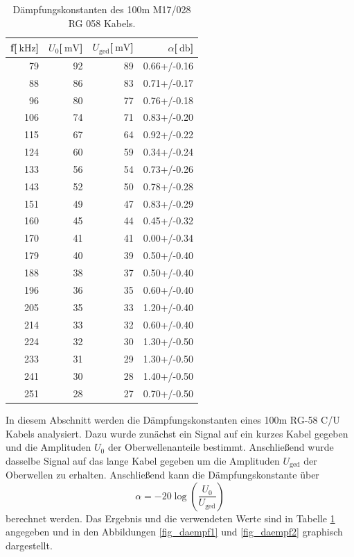 \begin{table}
\centering
	\caption[]{Dämpfungskonstanten des 100m M17/028 RG 058 Kabels.}
	\begin{tabular}{r r r r}
		f[$\SI{}{\kilo\hertz}$] & $U_0$[$\SI{}{\milli\volt}$] & $U_\text{ged}$[$\SI{}{\milli\volt}$] & $\alpha$[$\SI{}{\decibel}$]\\
		\hline \hline
			79	&	92	&	89	&	0.66+/-0.16 \\
			88	&	86	&	83	&	0.71+/-0.17 \\
			96	&	80	&	77	&	0.76+/-0.18 \\
			106	&	74	&	71	&	0.83+/-0.20 \\
			115	&	67	&	64	&	0.92+/-0.22 \\
			124	&	60	&	59	&	0.34+/-0.24 \\
			133	&	56	&	54	&	0.73+/-0.26 \\
			143	&	52	&	50	&	0.78+/-0.28 \\
			151	&	49	&	47	&	0.83+/-0.29 \\
			160	&	45	&	44	&	0.45+/-0.32 \\
			170	&	41	&	41	&	0.00+/-0.34 \\
			179	&	40	&	39	&	0.50+/-0.40 \\
			188	&	38	&	37	&	0.50+/-0.40 \\
			196	&	36	&	35	&	0.60+/-0.40 \\
			205	&	35	&	33	&	1.20+/-0.40 \\
			214	&	33	&	32	&	0.60+/-0.40 \\
			224	&	32	&	30	&	1.30+/-0.50 \\
			233	&	31	&	29	&	1.30+/-0.50 \\
			241	&	30	&	28	&	1.40+/-0.50 \\
			251	&	28	&	27	&	0.70+/-0.50\\
			\hline
	\end{tabular}
	\label{tab_daempf}
\end{table}

In diesem Abschnitt werden die Dämpfungskonstanten eines 100m RG-58 C/U Kabels analysiert.
Dazu wurde zunächst ein Signal auf ein kurzes Kabel gegeben und die Amplituden $U_0$ der Oberwellenanteile bestimmt.
Anschließend wurde dasselbe Signal auf das lange Kabel gegeben um die Amplituden $U_\text{ged}$ der Oberwellen zu erhalten.
Anschließend kann die Dämpfungskonstante über
\begin{equation*}
	\alpha = -20 \log \left( \frac{U_0}{U_\text{ged}}\right)
\end{equation*}
berechnet werden.
Das Ergebnis und die verwendeten Werte sind in Tabelle \ref{tab_daempf} angegeben und in den Abbildungen \ref{fig_daempf1} und \ref{fig_daempf2} graphisch dargestellt.

